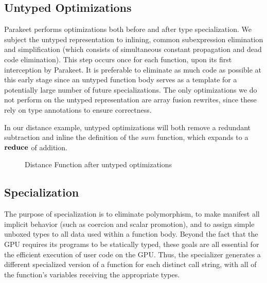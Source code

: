 \documentclass[preprint]{sigplanconf}
\begin{document}
\subsection{Untyped Optimizations}
Parakeet performs optimizations both before and after type specialization. We
subject the untyped representation to inlining, common subexpression elimination
and simplification (which consists of simultaneous constant propagation and dead
code elimination). This step occurs once for each function, upon its first
interception by Parakeet. It is preferable to eliminate as much code as possible
at this early stage since an untyped function body serves as a template for a
potentially large number of future specializations. The only optimizations we do
not perform on the untyped representation are array fusion rewrites, since these
rely on type annotations to ensure correctness.

In our distance example, untyped optimizations will both remove a redundant
subtraction and inline the definition of the $sum$ function, which expands to a
$\mbox{\textbf{reduce}}$ of addition.
\begin{figure}[h!]
\caption{Distance Function after untyped optimizations}
\end{figure}

\subsection{Specialization}
The purpose of specialization is to eliminate polymorphism, to make manifest
all implicit behavior (such as coercion and scalar promotion), and to assign
simple unboxed types to all data used within a function body. Beyond the
fact that the GPU requires its programs to be statically typed, these goals are
all essential for the efficient execution of user code on the GPU.
Thus, the specializer generates a different specialized version
of a function for each distinct call string, with all of the function's
variables receiving the appropriate types.  
\end{document}
